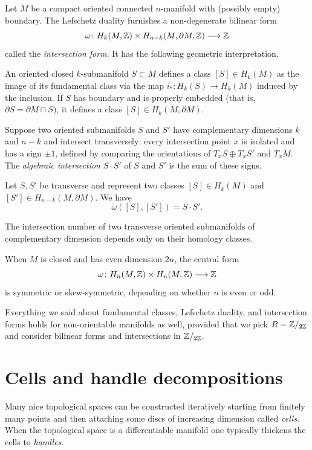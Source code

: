 Let $M$ be a compact oriented connected $n$-manifold with (possibly empty) boundary. The Lefschetz duality furnishes a non-degenerate bilinear form
$$\omega\colon H_k(M,\mathbb{Z}) \times H_{n-k}(M,\partial M, \mathbb{Z}) \longrightarrow \mathbb{Z}$$
called the \emph{intersection form}. It has the following geometric interpretation.

An oriented closed $k$-submanifold $S\subset M$ defines a class $[S] \in H_k(M)$ as the image of its fundamental class via the map $i_*\colon H_k(S) \to H_k(M)$ induced by the inclusion. If $S$ has boundary and is properly embedded (that is, $\partial S = \partial M \cap S)$, it defines a class $[S] \in H_k(M,\partial M)$.

Suppose two oriented submanifolds $S$ and $S'$ have complementary dimensions $k$ and $n-k$ and intersect transversely: every intersection point $x$ is isolated and has a sign $\pm 1$, defined by comparing the orientations of $T_x S \oplus T_xS'$ and $T_x M$. The \emph{algebraic intersection} $S\cdot S'$ of $S$ and $S'$ is the sum of these signs.  

\begin{teo} \label{pairing:teo}
Let $S, S'$ be transverse and represent two classes $[S]\in H_k(M)$ and $[S']\in H_{n-k}(M,\partial M)$. We have
$$\omega ([S], [S']) = S\cdot S'.$$
\end{teo}

\begin{cor} The intersection number of two transverse oriented submanifolds of complementary dimension depends only on their homology classes.
\end{cor}

When $M$ is closed and has even dimension $2n$, the central form
$$\omega\colon H_n(M,\mathbb{Z}) \times H_n(M, \mathbb{Z}) \longrightarrow \mathbb{Z}$$
is symmetric or skew-symmetric, depending on whether $n$ is even or odd. 

Everything we said about fundamental classes, Lefschetz duality, and intersection forms holds for non-orientable manifolds as well, provided that we pick $R = \mathbb{Z}/_{2\mathbb{Z}}$ and consider bilinear forms and intersections in $\mathbb{Z}/_{2\mathbb{Z}}$.

\section{Cells and handle decompositions} 
Many nice topological spaces can be constructed iteratively starting from finitely many points and then attaching some discs of increasing dimension called \emph{cells}. When the topological space is a differentiable manifold one typically thickens the cells to \emph{handles}. 

